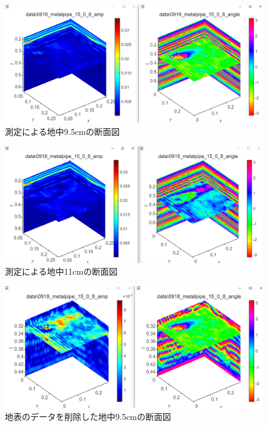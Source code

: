 \documentclass[12pt,a4paper]{jsreport}
\begin{document}
\begin{figure}[h]
  \begin{center}
   \includegraphics[width=14cm]{dataimage/matlab/0918_metalpipe_(15,0,8)_xdirection_d=32cm.png}
  \caption{測定による地中9.5cmの断面図}\label{測定による地中9.5cmの断面図}
  \end{center}
  \end{figure}
  \begin{figure}[h]
    \begin{center}
     \includegraphics[width=14cm]{dataimage/matlab/0918_metalpipe_(15,0,8)_xdirection_d=34cm.png}
    \caption{測定による地中11cmの断面図}\label{測定による地中11cmの断面図}
    \end{center}
    \end{figure}
    \begin{figure}[h]
      \begin{center}
       \includegraphics[width=14cm]{dataimage/matlab/0918_metalpipe_(15,0,8)_xdirection_d=32cm_delete_unnecessary.png}
      \caption{地表のデータを削除した地中9.5cmの断面図}\label{地表のデータを削除した地中9.5cmの断面図}
      \end{center}
      \end{figure}
\end{document}
